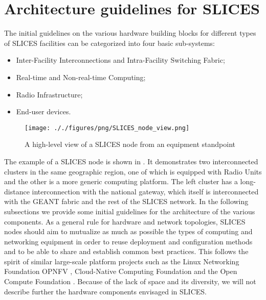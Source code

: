 \section{Architecture guidelines for SLICES}
\label{section:Architecture}

The initial guidelines on the various hardware building blocks for different types of SLICES facilities  can be categorized into four basic sub-systems:
\begin{itemize}
    \item Inter-Facility Interconnections and Intra-Facility Switching Fabric;
    \item Real-time and Non-real-time Computing;
    \item Radio Infrastructure;
    \item End-user devices. 

\end{itemize}
	
\begin{figure*}[t]
    \centering
    \texttt{[image: ././figures/png/SLICES\_node\_view.png]}
	\caption{A high-level view of a SLICES node from an equipment standpoint}
	\label{fig:SLICES-node-view}
\end{figure*}

The example of a SLICES node is shown in . It demonstrates two interconnected clusters in the same geographic region, one of which is equipped with Radio Units and the other is a more generic computing platform. 
The left cluster has a long-distance interconnection with the national gateway, which itself is interconnected with the GEANT fabric and the rest of the SLICES network. In the following subsections we provide some initial guidelines for the architecture of the various components.
As a general rule for hardware and network topologies, SLICES nodes should aim to mutualize as much as possible the types of computing and networking equipment in order to reuse deployment and configuration methods and to be able to share and establish common best practices. This follows the spirit of similar large-scale platform projects such as the Linux Networking Foundation OPNFV \cite{opnfv}, Cloud-Native Computing Foundation \cite{cncf} and the Open Compute Foundation \cite{ocf}.
Because of the lack of space and its diversity, we will not describe further the hardware components envisaged in SLICES.


